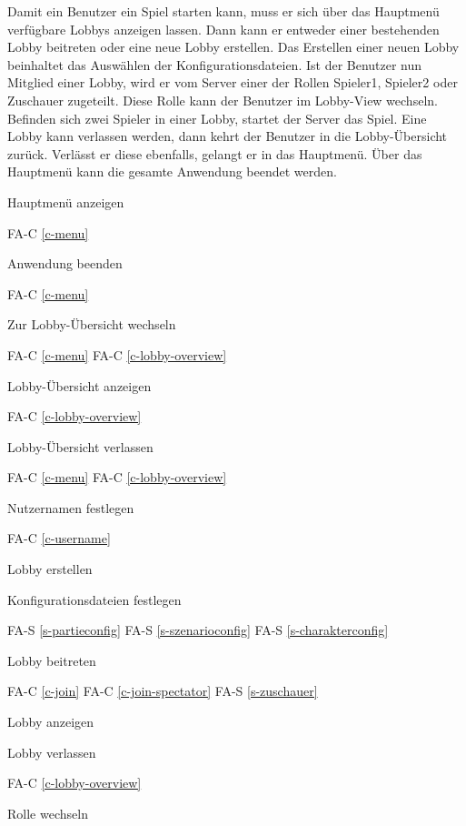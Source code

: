 Damit ein Benutzer ein Spiel starten kann, muss er sich über das Hauptmenü verfügbare Lobbys anzeigen lassen. Dann kann er entweder einer bestehenden Lobby beitreten oder eine neue Lobby erstellen. Das Erstellen einer neuen Lobby beinhaltet das Auswählen der Konfigurationsdateien. Ist der Benutzer nun Mitglied einer Lobby, wird er vom Server einer der Rollen Spieler1, Spieler2 oder Zuschauer zugeteilt. Diese Rolle kann der Benutzer im Lobby-View wechseln. Befinden sich zwei Spieler in einer Lobby, startet der Server das Spiel. Eine Lobby kann verlassen werden, dann kehrt der Benutzer in die Lobby-Übersicht zurück. Verlässt er diese ebenfalls, gelangt er in das Hauptmenü. Über das Hauptmenü kann die gesamte Anwendung beendet werden.

Hauptmenü anzeigen

FA-C \ref{c-menu} %

Anwendung beenden

FA-C \ref{c-menu} %

Zur Lobby-Übersicht wechseln

FA-C \ref{c-menu} %
FA-C \ref{c-lobby-overview} %

Lobby-Übersicht anzeigen

FA-C \ref{c-lobby-overview} %

Lobby-Übersicht verlassen

FA-C \ref{c-menu} %
FA-C \ref{c-lobby-overview} %

Nutzernamen festlegen

FA-C \ref{c-username} %

Lobby erstellen

Konfigurationsdateien festlegen

FA-S \ref{s-partieconfig} %
FA-S \ref{s-szenarioconfig} %
FA-S \ref{s-charakterconfig} %

Lobby beitreten

FA-C \ref{c-join} %
FA-C \ref{c-join-spectator} %
FA-S \ref{s-zuschauer} %

Lobby anzeigen

Lobby verlassen

FA-C \ref{c-lobby-overview} %

Rolle wechseln

